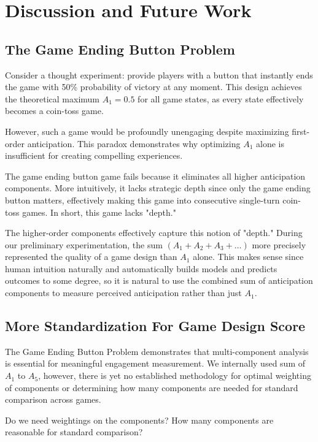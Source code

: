 \documentclass{article}
\begin{document}
\section{Discussion and Future Work}

\subsection{The Game Ending Button Problem}

Consider a thought experiment: provide players with a button that instantly ends the game with 50\% probability of victory at any moment. This design achieves the theoretical maximum $A_1 = 0.5$ for all game states, as every state effectively becomes a coin-toss game.

However, such a game would be profoundly unengaging despite maximizing first-order anticipation. This paradox demonstrates why optimizing $A_1$ alone is insufficient for creating compelling experiences.

The game ending button game fails because it eliminates all higher anticipation components. More intuitively, it lacks strategic depth since only the game ending button matters, effectively making this game into consecutive single-turn coin-toss games. In short, this game lacks "depth."

The higher-order components effectively capture this notion of "depth." During our preliminary experimentation, the sum $(A_1 + A_2 + A_3 + \ldots)$ more precisely represented the quality of a game design than $A_1$ alone.
This makes sense since human intuition naturally and automatically builds models and predicts outcomes to some degree, so it is natural to use the combined sum of anticipation components to measure perceived anticipation rather than just $A_1$.

\subsection{More Standardization For Game Design Score}

The Game Ending Button Problem demonstrates that multi-component analysis is essential for meaningful engagement measurement. We internally used sum of $A_1$ to $A_5$, however, there is yet no established methodology for optimal weighting of components or determining how many components are needed for standard comparison across games.

Do we need weightings on the components? How many components are reasonable for standard comparison?
\end{document}

